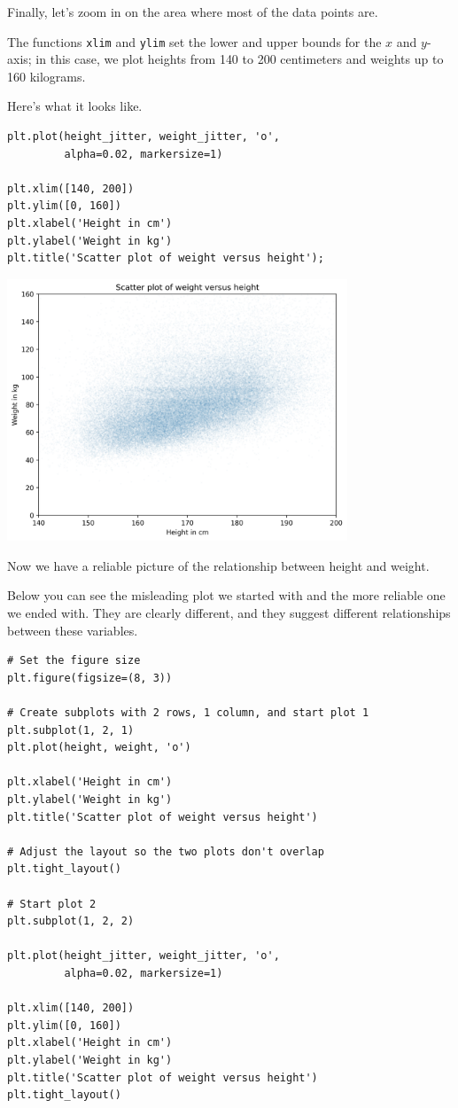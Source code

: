 Finally, let's zoom in on the area where most of the data points are.

The functions \passthrough{\lstinline!xlim!} and
\passthrough{\lstinline!ylim!} set the lower and upper bounds for the
\(x\) and \(y\)-axis; in this case, we plot heights from 140 to 200
centimeters and weights up to 160 kilograms.

Here's what it looks like.

\begin{lstlisting}[]
plt.plot(height_jitter, weight_jitter, 'o', 
         alpha=0.02, markersize=1)

plt.xlim([140, 200])
plt.ylim([0, 160])
plt.xlabel('Height in cm')
plt.ylabel('Weight in kg')
plt.title('Scatter plot of weight versus height');
\end{lstlisting}

\begin{center}
\includegraphics[width=4in]{chapters/09_relationships_files/09_relationships_25_0.png}
\end{center}

Now we have a reliable picture of the relationship between height and
weight.

Below you can see the misleading plot we started with and the more
reliable one we ended with. They are clearly different, and they suggest
different relationships between these variables.

\begin{lstlisting}[]
# Set the figure size
plt.figure(figsize=(8, 3))

# Create subplots with 2 rows, 1 column, and start plot 1
plt.subplot(1, 2, 1)
plt.plot(height, weight, 'o')

plt.xlabel('Height in cm')
plt.ylabel('Weight in kg')
plt.title('Scatter plot of weight versus height')

# Adjust the layout so the two plots don't overlap
plt.tight_layout()

# Start plot 2
plt.subplot(1, 2, 2)

plt.plot(height_jitter, weight_jitter, 'o', 
         alpha=0.02, markersize=1)

plt.xlim([140, 200])
plt.ylim([0, 160])
plt.xlabel('Height in cm')
plt.ylabel('Weight in kg')
plt.title('Scatter plot of weight versus height')
plt.tight_layout()
\end{lstlisting}

